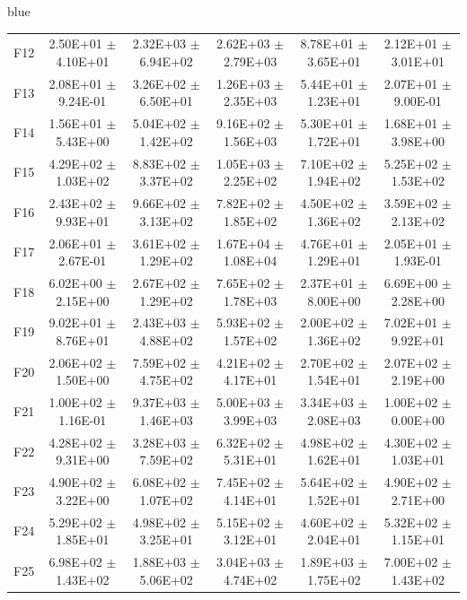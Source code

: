 \documentclass[journal, onecolumn]{IEEEtran}
\begin{document}
\begin{color}{blue}
\begin{table}[htbp!]
\begin{tabular}{c|ccccc}
			F12	 &	2.50E+01	$\pm$	4.10E+01	 &	2.32E+03	$\pm$	6.94E+02		 &	2.62E+03	$\pm$	2.79E+03		 &	8.78E+01	$\pm$	3.65E+01		 &	2.12E+01	$\pm$	3.01E+01	\\	
			F13	 &	2.08E+01	$\pm$	9.24E-01	 &	3.26E+02	$\pm$	6.50E+01		 &	1.26E+03	$\pm$	2.35E+03		 &	5.44E+01	$\pm$	1.23E+01		 &	2.07E+01	$\pm$	9.00E-01	\\	
			F14	 &	1.56E+01	$\pm$	5.43E+00	 &	5.04E+02	$\pm$	1.42E+02		 &	9.16E+02	$\pm$	1.56E+03		 &	5.30E+01	$\pm$	1.72E+01		 &	1.68E+01	$\pm$	3.98E+00	\\	
			F15	 &	4.29E+02	$\pm$	1.03E+02	 &	8.83E+02	$\pm$	3.37E+02		 &	1.05E+03	$\pm$	2.25E+02		 &	7.10E+02	$\pm$	1.94E+02		 &	5.25E+02	$\pm$	1.53E+02	\\	
			F16	 &	2.43E+02	$\pm$	9.93E+01	 &	9.66E+02	$\pm$	3.13E+02		 &	7.82E+02	$\pm$	1.85E+02		 &	4.50E+02	$\pm$	1.36E+02		 &	3.59E+02	$\pm$	2.13E+02	\\	
			F17	 &	2.06E+01	$\pm$	2.67E-01	 &	3.61E+02	$\pm$	1.29E+02		 &	1.67E+04	$\pm$	1.08E+04		 &	4.76E+01	$\pm$	1.29E+01		 &	2.05E+01	$\pm$	1.93E-01	\\	
			F18	 &	6.02E+00	$\pm$	2.15E+00	 &	2.67E+02	$\pm$	1.29E+02		 &	7.65E+02	$\pm$	1.78E+03		 &	2.37E+01	$\pm$	8.00E+00		 &	6.69E+00	$\pm$	2.28E+00	\\	
			F19	 &	9.02E+01	$\pm$	8.76E+01	 &	2.43E+03	$\pm$	4.88E+02		 &	5.93E+02	$\pm$	1.57E+02		 &	2.00E+02	$\pm$	1.36E+02		 &	7.02E+01	$\pm$	9.92E+01	\\	
			F20	 &	2.06E+02	$\pm$	1.50E+00	 &	7.59E+02	$\pm$	4.75E+02		 &	4.21E+02	$\pm$	4.17E+01		 &	2.70E+02	$\pm$	1.54E+01		 &	2.07E+02	$\pm$	2.19E+00	\\	
			F21	 &	1.00E+02	$\pm$	1.16E-01	 &	9.37E+03	$\pm$	1.46E+03		 &	5.00E+03	$\pm$	3.99E+03		 &	3.34E+03	$\pm$	2.08E+03		 &	1.00E+02	$\pm$	0.00E+00	\\	
			F22	 &	4.28E+02	$\pm$	9.31E+00	 &	3.28E+03	$\pm$	7.59E+02		 &	6.32E+02	$\pm$	5.31E+01		 &	4.98E+02	$\pm$	1.62E+01		 &	4.30E+02	$\pm$	1.03E+01	\\	
			F23	 &	4.90E+02	$\pm$	3.22E+00	 &	6.08E+02	$\pm$	1.07E+02		 &	7.45E+02	$\pm$	4.14E+01		 &	5.64E+02	$\pm$	1.52E+01		 &	4.90E+02	$\pm$	2.71E+00	\\	
			F24	 &	5.29E+02	$\pm$	1.85E+01	 &	4.98E+02	$\pm$	3.25E+01		 &	5.15E+02	$\pm$	3.12E+01		 &	4.60E+02	$\pm$	2.04E+01		 &	5.32E+02	$\pm$	1.15E+01	\\	
			F25	 &	6.98E+02	$\pm$	1.43E+02	 &	1.88E+03	$\pm$	5.06E+02		 &	3.04E+03	$\pm$	4.74E+02		 &	1.89E+03	$\pm$	1.75E+02		 &	7.00E+02	$\pm$	1.43E+02	\\	

\end{tabular}
\end{table}
\end{color}
\end{document}
